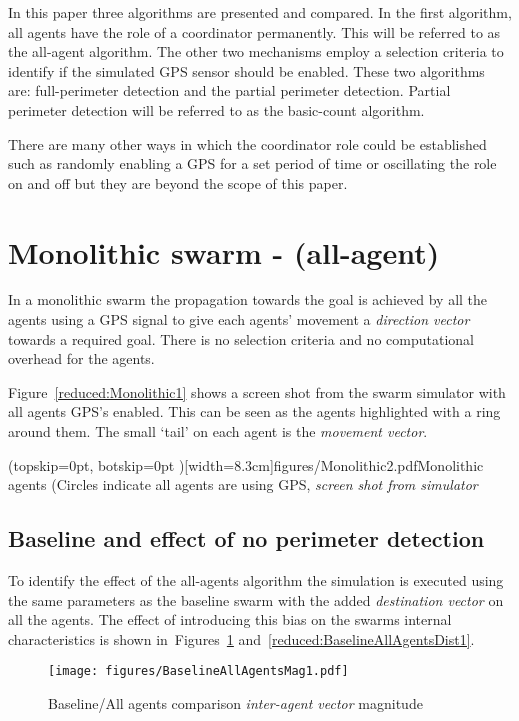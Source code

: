 \documentclass{ieeeaccess}
\begin{document}
In this paper three algorithms are presented and compared. In the first algorithm, all agents have the role of a coordinator permanently. This will be referred to as the all-agent algorithm. The other two mechanisms employ a selection criteria to identify if the simulated GPS sensor should be enabled. These two algorithms are: full-perimeter detection and the partial perimeter detection. Partial perimeter detection will be referred to as the basic-count algorithm.

There are many other ways in which the coordinator role could be established such as randomly enabling a GPS for a set period of time or oscillating the role on and off but they are beyond the scope of this paper.

\section{Monolithic swarm - (all-agent)} 
In a monolithic swarm \cite{BS:13} the propagation towards the goal is achieved by all the agents using a GPS signal to give each agents' movement a \textit{direction vector} towards a required goal. There is no selection criteria and no computational overhead for the agents.

Figure~\ref{reduced:Monolithic1} shows a screen shot from the swarm simulator with all agents GPS's enabled. This can be seen as the agents highlighted with a ring around them. The small `tail' on each agent is the \textit{movement vector}.


\Figure[t!](topskip=0pt, botskip=0pt )[width=8.3cm]{figures/Monolithic2.pdf}{Monolithic agents (Circles indicate all agents are using GPS, \textit{screen shot from simulator}\label{reduced:Monolithic1}}

\subsection{Baseline and effect of no perimeter detection\label{section:compareBaselineNoPerimeter}}
To identify the effect of the all-agents algorithm the simulation is executed using the same parameters as the baseline swarm with the added \textit{destination vector} on all the agents. The effect of introducing this bias on the swarms internal characteristics is shown in~Figures~\ref{reduced:BaselineAllAgentsMag1} and~\ref{reduced:BaselineAllAgentsDist1}.
\begin{figure}
\begin{center}
\texttt{[image: figures/BaselineAllAgentsMag1.pdf]}
\end{center}
\caption{Baseline/All agents comparison \textit{inter-agent vector} magnitude\label{reduced:BaselineAllAgentsMag1}}
\end{figure}
\end{document}

